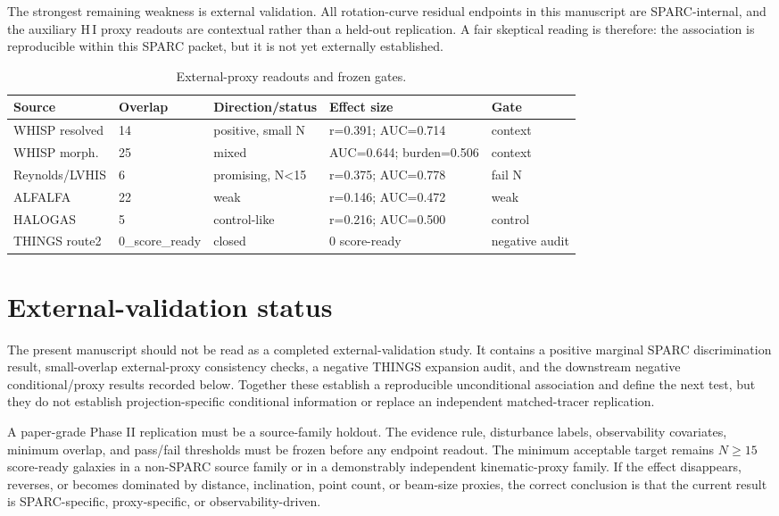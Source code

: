 \documentclass[11pt]{article}
\begin{document}
The strongest remaining weakness is external validation. All rotation-curve residual endpoints in this manuscript are SPARC-internal, and the auxiliary H\,I proxy readouts are contextual rather than a held-out replication. A fair skeptical reading is therefore: the association is reproducible within this SPARC packet, but it is not yet externally established.

\begin{table}[H]
\centering
\caption{External-proxy readouts and frozen gates.}
\label{tab:external}
\footnotesize
\begin{tabular}{lllll}
\toprule
Source & Overlap & Direction/status & Effect size & Gate\\
\midrule
WHISP resolved & 14 & positive, small N & r=0.391; AUC=0.714 & context\\
WHISP morph. & 25 & mixed & AUC=0.644; burden=0.506 & context\\
Reynolds/LVHIS & 6 & promising, N<15 & r=0.375; AUC=0.778 & fail N\\
ALFALFA & 22 & weak & r=0.146; AUC=0.472 & weak\\
HALOGAS & 5 & control-like & r=0.216; AUC=0.500 & control\\
THINGS route2 & 0\_score\_ready & closed & 0 score-ready & negative audit\\
\bottomrule
\end{tabular}
\end{table}

\section{External-validation status}

The present manuscript should not be read as a completed external-validation study. It contains a positive marginal SPARC discrimination result, small-overlap external-proxy consistency checks, a negative THINGS expansion audit, and the downstream negative conditional/proxy results recorded below. Together these establish a reproducible unconditional association and define the next test, but they do not establish projection-specific conditional information or replace an independent matched-tracer replication.

A paper-grade Phase II replication must be a source-family holdout. The evidence rule, disturbance labels, observability covariates, minimum overlap, and pass/fail thresholds must be frozen before any endpoint readout. The minimum acceptable target remains $N\geq15$ score-ready galaxies in a non-SPARC source family or in a demonstrably independent kinematic-proxy family. If the effect disappears, reverses, or becomes dominated by distance, inclination, point count, or beam-size proxies, the correct conclusion is that the current result is SPARC-specific, proxy-specific, or observability-driven.
\end{document}
